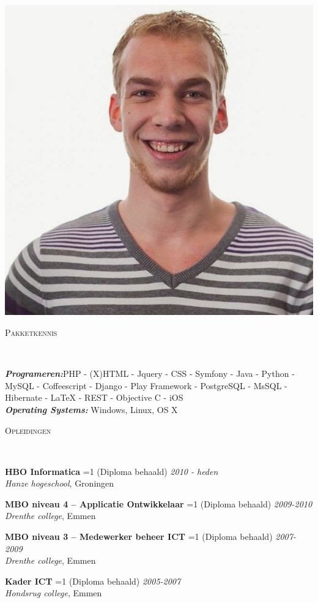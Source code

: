 \documentclass[9pt]{article}
\newenvironment{changemargin}[2]{%
  \begin{list}{}{%
    \setlength{\topsep}{0pt}%
    \setlength{\leftmargin}{#1}%
    \setlength{\rightmargin}{#2}%
    \setlength{\listparindent}{\parindent}%
    \setlength{\itemindent}{\parindent}%
    \setlength{\parsep}{\parskip}%
  }%
  \item[]}{\end{list}
}
\newcommand{\lineover}{
	\begin{changemargin}{-0.05in}{-0.05in}
		\vspace*{-8pt}
		\hrulefill \\
		\vspace*{-2pt}
	\end{changemargin}
}
\newcommand{\header}[1]{
	\begin{changemargin}{-0.5in}{-0.5in}
		\scshape{\niceHeadSmall#1}\\
  	\lineover
	\end{changemargin}
}
\newenvironment{body} {
	\vspace*{-16pt}
	\begin{changemargin}{-0.25in}{-0.5in}
  }	
	{\end{changemargin}
}
\newcommand{\school}[5]{
	\textbf{#1}
	\ifnum#5=1
		(Diploma behaald)
	\fi
	 \hfill \emph{#2\\}
	\emph{#3},  
	#4\\
	\medskip
}
\begin{document}
\begin{body}
\begin{minipage}[c]{0.30\textwidth}
\begin{flushright}
			\includegraphics[width=1\textwidth,frame]{pasfoto}
		\end{flushright}
	\end{minipage}
\end{body}

\smallskip

\header{Pakketkennis}

\begin{body}
	\vspace{14pt}
	\emph{\textbf{Programeren:}}PHP - (X)HTML - Jquery - CSS - Symfony - Java - Python - MySQL - Coffeescript - Django - Play Framework - PostgreSQL - MsSQL - Hibernate - LaTeX - REST - Objective C - iOS\\
	\medskip
	\emph{\textbf{Operating Systems:}} Windows, Linux, OS X\\
\end{body}

\smallskip
\header{Opleidingen}
\begin{body}
	\vspace{14pt}
	\school{HBO Informatica}{2010 - heden}{Hanze hogeschool}{Groningen}{0}
	\school{MBO niveau 4 -- Applicatie Ontwikkelaar}{2009-2010}{Drenthe college}{Emmen}{1}
	\school{MBO niveau 3 -- Medewerker beheer ICT}{2007-2009}{Drenthe college}{Emmen}{1}
	\school{Kader ICT}{2005-2007}{Hondsrug college}{Emmen}{1}
\end{body}
\end{document}
